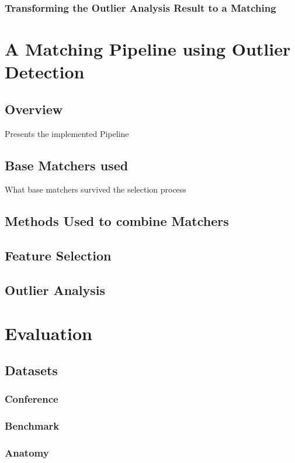 \documentclass[11pt,titlepage,oneside,openany,a4paper]{report}
\begin{document}
\subsection{Transforming the Outlier Analysis Result to a Matching}


\chapter{A Matching Pipeline using Outlier Detection}

\section{Overview}
Presents the implemented Pipeline
\section{Base Matchers used}
What base matchers survived the selection process
\section{Methods Used to combine Matchers}

\section{Feature Selection}

\section{Outlier Analysis}



\chapter{Evaluation}
\section{Datasets}
\subsection{Conference}
\subsection{Benchmark}
\subsection{Anatomy}
\end{document}
